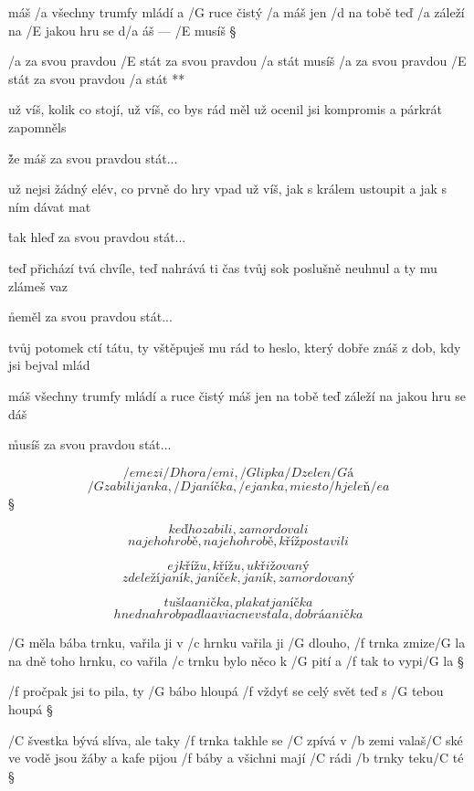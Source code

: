 
máš /a všechny trumfy mládí a /G ruce čistý /a máš
jen /d na tobě teď /a záleží na /E jakou hru se d/a áš --- /E musíš \S

\R /a za svou pravdou /E stát
   za svou pravdou /a stát
   musíš /a za svou pravdou /E stát
   za svou pravdou /a stát **

už víš, kolik co stojí, už víš, co bys rád měl
už ocenil jsi kompromis a párkrát zapomněls \s

\r že máš za svou pravdou stát...

už nejsi žádný elév, co prvně do hry vpad
už víš, jak s králem ustoupit a jak s ním dávat mat \s

\r tak hleď za svou pravdou stát...

teď přichází tvá chvíle, teď nahrává ti čas
tvůj  sok poslušně neuhnul a ty  mu zlámeš vaz \s

\r neměl za svou pravdou stát...

tvůj potomek ctí tátu, ty vštěpuješ mu rád
to heslo, který dobře znáš z dob, kdy jsi bejval mlád \s

máš všechny trumfy mládí a ruce čistý máš
jen na tobě teď záleží na jakou hru se dáš \s

\r musíš za svou pravdou stát...




\[ /e mezi /D hora/e mi, /G lipka /D zelen/G á \]
\[ /G zabili janka, /D janíčka, /e janka, miesto /h jeleň/e a \] \S

\[ keď ho zabili, zamordovali \]
\[ na jeho hrobě, na jeho hrobě, kříž postavili \] \s

\[ ej křížu, křížu, ukřižovaný \]
\[ zde leží janík, janíček, janík, zamordovaný \] \s


\[ tu šla anička, plakat janíčka \]
\[ hned na hrob padla a viac nevstala, dobrá anička \]



/G měla bába trnku, vařila ji v /c hrnku
vařila ji /G dlouho, /f trnka zmize/G la
na dně toho hrnku, co vařila /c trnku
bylo něco k /G pití a /f tak to vypi/G la \S

/f pročpak jsi to pila, ty /G bábo hloupá
/f vždyť se celý svět teď s /G tebou houpá \S

/C švestka bývá slíva, ale taky /f trnka
takhle se /C zpívá v /b zemi valaš/C ské
ve vodě jsou žáby a kafe pijou /f báby
a všichni mají /C rádi /b trnky teku/C té \S

